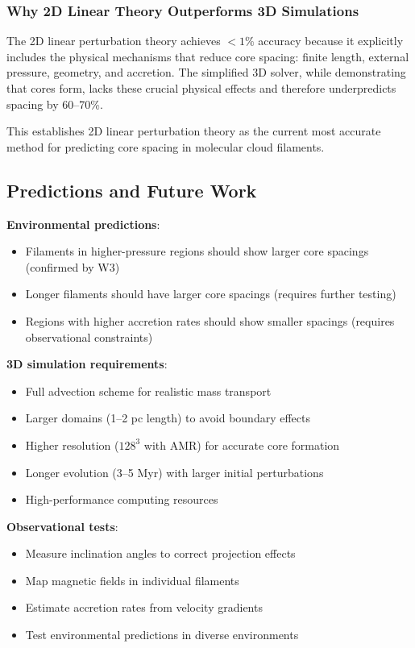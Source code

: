\documentclass[11pt,a4paper]{article}
\begin{document}
\subsubsection{Why 2D Linear Theory Outperforms 3D Simulations}

The 2D linear perturbation theory achieves $<1\%$ accuracy because it explicitly includes the physical mechanisms that reduce core spacing: finite length, external pressure, geometry, and accretion. The simplified 3D solver, while demonstrating that cores form, lacks these crucial physical effects and therefore underpredicts spacing by 60--70\%.

This establishes 2D linear perturbation theory as the current most accurate method for predicting core spacing in molecular cloud filaments.

\subsection{Predictions and Future Work}

\textbf{Environmental predictions}:
\begin{itemize}
    \item Filaments in higher-pressure regions should show larger core spacings (confirmed by W3)
    \item Longer filaments should have larger core spacings (requires further testing)
    \item Regions with higher accretion rates should show smaller spacings (requires observational constraints)
\end{itemize}

\textbf{3D simulation requirements}:
\begin{itemize}
    \item Full advection scheme for realistic mass transport
    \item Larger domains (1--2 pc length) to avoid boundary effects
    \item Higher resolution ($128^3$ with AMR) for accurate core formation
    \item Longer evolution (3--5 Myr) with larger initial perturbations
    \item High-performance computing resources
\end{itemize}

\textbf{Observational tests}:
\begin{itemize}
    \item Measure inclination angles to correct projection effects
    \item Map magnetic fields in individual filaments
    \item Estimate accretion rates from velocity gradients \citep{Chen2024}
    \item Test environmental predictions in diverse environments
\end{itemize}
\end{document}
